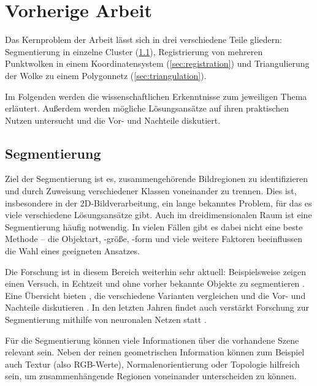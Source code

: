
\chapter{Vorherige Arbeit}
\label{ch:vorherige-arbeit}

Das Kernproblem der Arbeit lässt sich in drei verschiedene Teile gliedern:
Segmentierung in einzelne Cluster (\ref{sec:segmentation}), Registrierung von mehreren Punktwolken in einem Koordinatensystem (\ref{sec:registration}) und Triangulierung der Wolke zu einem Polygonnetz (\ref{sec:triangulation}).

Im Folgenden werden die wissenschaftlichen Erkenntnisse zum jeweiligen Thema erläutert.
Außerdem werden mögliche Lösungsansätze auf ihren praktischen Nutzen untersucht und die Vor- und Nachteile diskutiert.



\section{Segmentierung}
\label{sec:segmentation}

Ziel der Segmentierung ist es, zusammengehörende Bildregionen zu identifizieren und durch Zuweisung verschiedener Klassen voneinander zu trennen.
Dies ist, insbesondere in der 2D-Bildverarbeitung, ein lange bekanntes Problem, für das es viele verschiedene Lösungsansätze gibt.
Auch im dreidimensionalen Raum ist eine Segmentierung häufig notwendig.
In vielen Fällen gibt es dabei nicht eine beste Methode -- die Objektart, -größe, -form und viele weitere Faktoren beeinflussen die Wahl eines geeigneten Ansatzes.

Die Forschung ist in diesem Bereich weiterhin sehr aktuell:
Beispielsweise zeigen \citeauthor{uckermann2012real} einen Versuch, in Echtzeit und ohne vorher bekannte Objekte zu segmentieren \cite{uckermann2012real}.
Eine Übersicht bieten \citeauthor{nguyen20133d}, die verschiedene Varianten vergleichen und die Vor- und Nachteile diskutieren \cite{nguyen20133d}.
In den letzten Jahren findet auch verstärkt Forschung zur Segmentierung mithilfe von neuronalen Netzen statt \cite{te2018rgcnn}.

Für die Segmentierung können viele Informationen über die vorhandene Szene relevant sein.
Neben der reinen geometrischen Information können zum Beispiel auch Textur (also RGB-Werte), Normalenorientierung oder Topologie hilfreich sein, um zusammenhängende Regionen voneinander unterscheiden zu können.

